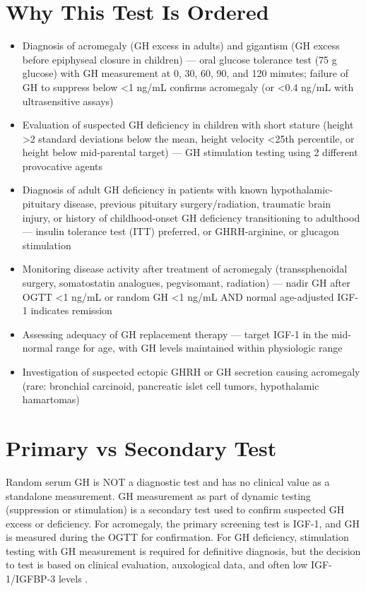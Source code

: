 \section*{Why This Test Is Ordered}
\begin{itemize}
  \item Diagnosis of acromegaly (GH excess in adults) and gigantism (GH excess before epiphyseal closure in children) --- oral glucose tolerance test (75 g glucose) with GH measurement at 0, 30, 60, 90, and 120 minutes; failure of GH to suppress below <1 ng/mL confirms acromegaly (or <0.4 ng/mL with ultrasensitive assays)
  \item Evaluation of suspected GH deficiency in children with short stature (height >2 standard deviations below the mean, height velocity <25th percentile, or height below mid-parental target) --- GH stimulation testing using 2 different provocative agents
  \item Diagnosis of adult GH deficiency in patients with known hypothalamic-pituitary disease, previous pituitary surgery/radiation, traumatic brain injury, or history of childhood-onset GH deficiency transitioning to adulthood --- insulin tolerance test (ITT) preferred, or GHRH-arginine, or glucagon stimulation
  \item Monitoring disease activity after treatment of acromegaly (transsphenoidal surgery, somatostatin analogues, pegvisomant, radiation) --- nadir GH after OGTT <1 ng/mL or random GH <1 ng/mL AND normal age-adjusted IGF-1 indicates remission
  \item Assessing adequacy of GH replacement therapy --- target IGF-1 in the mid-normal range for age, with GH levels maintained within physiologic range
  \item Investigation of suspected ectopic GHRH or GH secretion causing acromegaly (rare: bronchial carcinoid, pancreatic islet cell tumors, hypothalamic hamartomas)
\end{itemize}

\section*{Primary vs Secondary Test}
Random serum GH is NOT a diagnostic test and has no clinical value as a standalone measurement. GH measurement as part of dynamic testing (suppression or stimulation) is a secondary test used to confirm suspected GH excess or deficiency. For acromegaly, the primary screening test is IGF-1, and GH is measured during the OGTT for confirmation. For GH deficiency, stimulation testing with GH measurement is required for definitive diagnosis, but the decision to test is based on clinical evaluation, auxological data, and often low IGF-1/IGFBP-3 levels \cite{molitch2011evaluation}.

